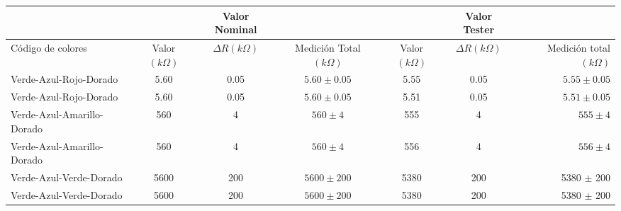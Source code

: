 
\begin{tabular}{|l | c  c  c | c  c  r |}
\hline
&&Valor Nominal&&&Valor Tester& \\ \hline
Código de colores           &Valor $(k \Omega)$ &$\Delta R (k\Omega)$       &Medición Total $(k \Omega)$ &Valor $(k \Omega)$   &$\Delta R (k \Omega)$  &Medición total $(k \Omega)$ \\ \hline
Verde-Azul-Rojo-Dorado      &5.60                        &0.05                       &$5.60 \pm 0.05$ &5.55                                   &0.05                   &$5.55 \pm 0.05$ \\
Verde-Azul-Rojo-Dorado      &5.60                        &0.05                       &$5.60 \pm 0.05$ &5.51                                   &0.05                   &$5.51 \pm 0.05$ \\ 
Verde-Azul-Amarillo-Dorado  &560                        &4                          &$560 \pm 4$    &555                                    &4                      &$555 \pm 4$ \\
Verde-Azul-Amarillo-Dorado  &560                        &4                          &$560 \pm 4$    &556                                    &4                      &$556 \pm 4$ \\
Verde-Azul-Verde-Dorado     &5600                       &200                        &$5600 \pm 200$ &5380                                   &200                    &5380  $\pm$ 200 \\
Verde-Azul-Verde-Dorado     &5600                       &200                        &$5600 \pm 200$ &5380                                   &200                    &5380  $\pm$ 200 \\ \hline
\end{tabular}

